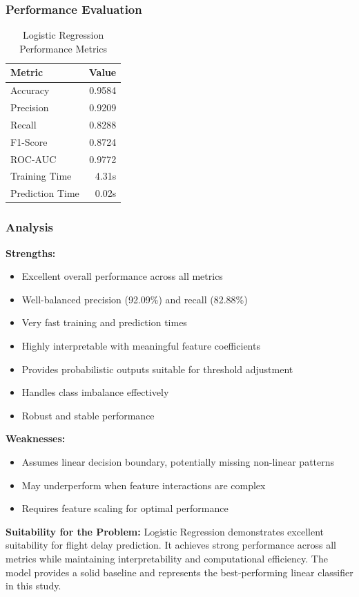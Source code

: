 \documentclass[sigconf]{acmart}
\begin{document}
\subsubsection{Performance Evaluation}
\begin{table}[h]
\centering
\caption{Logistic Regression Performance Metrics}
\begin{tabular}{lr}
\toprule
Metric & Value \\
\midrule
Accuracy & 0.9584 \\
Precision & 0.9209 \\
Recall & 0.8288 \\
F1-Score & 0.8724 \\
ROC-AUC & 0.9772 \\
Training Time & 4.31s \\
Prediction Time & 0.02s \\
\bottomrule
\end{tabular}
\end{table}

\subsubsection{Analysis}
\textbf{Strengths:}
\begin{itemize}
    \item Excellent overall performance across all metrics
    \item Well-balanced precision (92.09\%) and recall (82.88\%)
    \item Very fast training and prediction times
    \item Highly interpretable with meaningful feature coefficients
    \item Provides probabilistic outputs suitable for threshold adjustment
    \item Handles class imbalance effectively
    \item Robust and stable performance
\end{itemize}

\textbf{Weaknesses:}
\begin{itemize}
    \item Assumes linear decision boundary, potentially missing non-linear patterns
    \item May underperform when feature interactions are complex
    \item Requires feature scaling for optimal performance
\end{itemize}

\textbf{Suitability for the Problem:} Logistic Regression demonstrates excellent suitability for flight delay prediction. It achieves strong performance across all metrics while maintaining interpretability and computational efficiency. The model provides a solid baseline and represents the best-performing linear classifier in this study.
\end{document}
